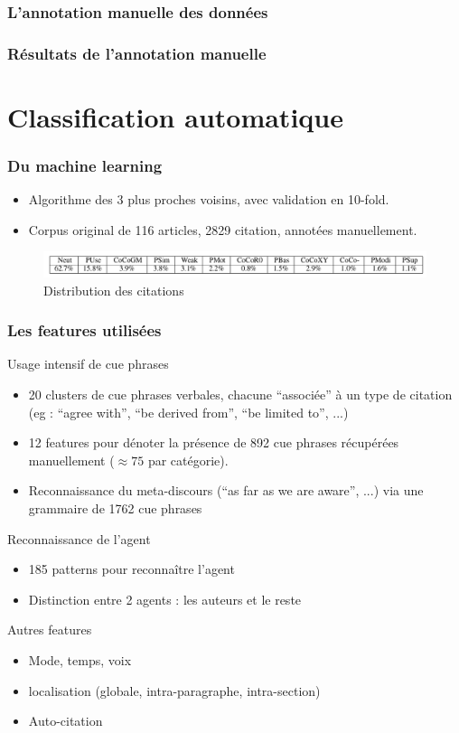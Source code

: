 \documentclass[10pt]{beamer}
\begin{document}
\begin{frame}
  \frametitle{L'annotation manuelle des données}
\end{frame}

\begin{frame}
  \frametitle{Résultats de l'annotation manuelle}
\end{frame}

\section{Classification automatique}
\label{sec:machinelearning}

\begin{frame}
\frametitle{Du machine learning}
  \begin{itemize} 
  \item Algorithme des 3 plus proches voisins, avec validation en 10-fold.
  \item Corpus original de 116 articles, 2829 citation, annotées manuellement.
  \end{itemize}
  \begin{figure}[h]
    \centering
    \includegraphics[width=\textwidth]{distrib}
    \caption{Distribution des citations}
  \end{figure}
\end{frame}

\begin{frame}
  \frametitle{Les features utilisées}
  Usage intensif de cue phrases
  \begin{itemize}
  \item 20 clusters de cue phrases verbales, chacune ``associée'' à un
    type de citation (eg : ``agree with'', ``be derived from'', ``be
    limited to'', ...)
  \item 12 features pour dénoter la présence de 892 cue phrases
    récupérées manuellement ($\approx 75$ par catégorie).
  \item Reconnaissance du meta-discours (``as far as we are aware'',
    ...) via une grammaire de 1762 cue phrases
  \end{itemize}
  Reconnaissance de l'agent
    \begin{itemize}
    \item 185 patterns pour reconnaître l'agent
    \item Distinction entre 2 agents : les auteurs et le reste
    \end{itemize}
  Autres features
  \begin{itemize}
  \item Mode, temps, voix
  \item localisation (globale, intra-paragraphe,
    intra-section)
  \item Auto-citation
  \end{itemize}

\end{frame}
\end{document}

